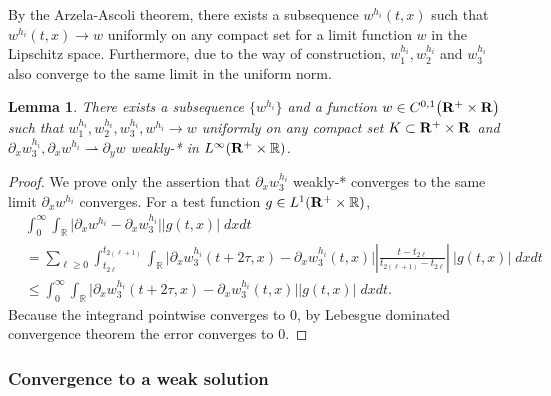 \documentclass[11pt]{amsart}
\def\R{{\bf R}}
\def\R{\mathbb{R}}
\def\R{{\bf R}}
\newtheorem{lemma}{Lemma}[section]
\begin{document}
By the Arzela-Ascoli theorem, there exists a subsequence $w^{h_i}(t,x)$ such that $w^{h_i}(t,x)\to w$ uniformly on any compact set for a limit function $w$ in the Lipschitz space. Furthermore, due to the way of construction, $w_1^{h_i},w_2^{h_i}$ and $w_3^{h_i}$ also converge to the same limit in the uniform norm.

\begin{lemma}\label{compactness} There exists a subsequence $\{w^{h_i}\}$ and a function $w\in C^{0,1}\big(\R^+\times \R\big)$ such that $w_1^{h_i},w_2^{h_i},w_3^{h_i},w^{h_i}\rightarrow w$ uniformly on any compact set $K \subset \R^+\times \R$ and $\partial_x w_3^{h_i}, \partial_x w^{h_i} \rightharpoonup \partial_y w$ weakly-* in $L^\infty(\R^+\times \mathbb{R})$.
\end{lemma}
\begin{proof}
 We prove only the assertion that $\partial_x w_3^{h_i}$ weakly-* converges to the same limit $\partial_x w^{h_i}$ converges.  %
 For a test function $g\in L^1(\R^+\times \mathbb{R})$,
 \begin{align*}
  &\int_0^\infty\int_\mathbb{R} \Big|\partial_x {w}^{h_i} - \partial_x w_3^{h_i}\Big| \Big|g(t,x)\Big| \; dxdt  \\%
  &= \sum_{\ell\ge0}\int_{t_{2\ell}}^{t_{2(\ell+1)}}\int_\mathbb{R} \Big|\partial_x w_3^{h_i}(t+2\tau,x)-\partial_x w_3^{h_i}(t,x) \Big| \left|\frac{t-t_{2\ell}}{t_{2(\ell+1)}-t_{2\ell}}\right|~\Big|g(t,x)\Big| \;dxdt\\
  &\le \int_0^\infty \int_\mathbb{R} \Big|\partial_x w_3^{h_i}(t+2\tau,x)-\partial_x w_3^{h_i}(t,x) \Big| \Big|g(t,x)\Big| \; dxdt.
 \end{align*}
 Because the integrand pointwise converges to $0$, by Lebesgue dominated convergence theorem the error converges to $0$.
\end{proof}

\subsubsection{Convergence to a weak solution}
\end{document}
